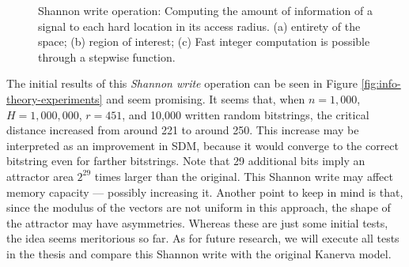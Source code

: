\begin{figure}[h!]
  \caption{Shannon write operation:  Computing the amount of information of a signal to each hard location in its access radius. (a) entirety of the space; (b) region of interest; (c) Fast integer computation is possible through a stepwise function.}
  \label{fig:info-theory-hypothesis}
\end{figure}


The initial results of this \emph{Shannon write} operation can be seen in Figure \ref{fig:info-theory-experiments} and seem promising. It seems that, when $n=1,000$, $H=1,000,000$, $r=451$, and 10,000 written random bitstrings, the critical distance increased from around 221 to around 250. This increase may be interpreted as an improvement in SDM, because it would converge to the correct bitstring even for farther bitstrings. Note that 29 additional bits imply an attractor area $2^{29}$ times larger than the original. This Shannon write may affect memory capacity --- possibly increasing it. Another point to keep in mind is that, since the modulus of the vectors are not uniform in this approach, the shape of the attractor may have asymmetries. Whereas these are just some initial tests, the idea seems meritorious so far.  As for future research, we will execute all tests in the thesis and compare this Shannon write with the original Kanerva model.




